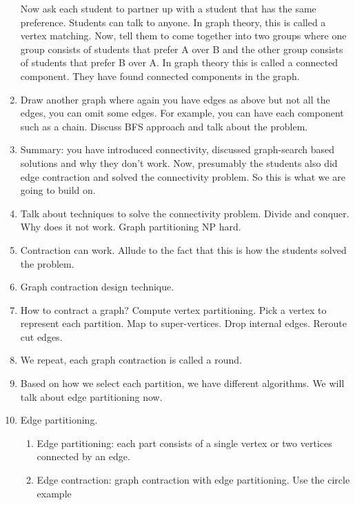 \begin{notesonly}
\begin{enumerate}
%
Now ask each student to partner up with a student that has the same
preference.  Students can talk to anyone.
%
In graph theory, this is called a vertex matching.
%
Now, tell them to come together into two groups where one group
consists of students that prefer A over B and the other group consists
of students that prefer B over A. 
%
In graph theory this is called a connected component.  They have found
connected components in the graph.


\item Draw another graph where again you have edges as above but not
  all the edges, you can omit some edges.  For example, you can have
  each component such as a chain. Discuss BFS approach and talk about
  the problem.

\item Summary: you have introduced connectivity, discussed
  graph-search based solutions and why they don't work.  Now,
  presumably the students also did edge contraction and solved the
  connectivity problem.  So this is what we are going to build on.


\item Talk about techniques to solve the connectivity problem.  Divide
  and conquer. Why does it not work. Graph partitioning NP hard.

\item Contraction can work.  Allude to the fact that this is how the
  students solved the problem.  

\item Graph contraction design technique.

\item How to contract a graph? Compute vertex partitioning.  Pick a
  vertex to represent each partition.  Map to super-vertices.  Drop
  internal edges. Reroute cut edges.


\item We repeat, each graph contraction is called a round.

\item Based on how we select each partition, we have different
  algorithms. We will talk about edge partitioning now.


\item Edge partitioning.
\begin{enumerate}
\item Edge partitioning: each part consists of a single vertex or
  two vertices connected by an edge.

\item Edge contraction: graph contraction with edge partitioning. Use
  the circle example~


\end{enumerate}
\end{enumerate}
\end{notesonly}

